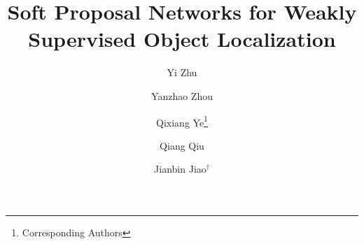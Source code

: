 \documentclass[10pt,twocolumn,letterpaper]{article}
\begin{document}
\makeatletter
\renewcommand*{\@fnsymbol}[1]{\dag}
\makeatother

\title{Soft Proposal Networks for Weakly Supervised Object Localization}

\author[1]{Yi Zhu}
\author[1]{Yanzhao Zhou}
\author[1]{Qixiang Ye\thanks{Corresponding Authors}}
\author[2]{Qiang Qiu}
\author[1]{Jianbin Jiao$^\dag$}


\renewcommand\Authands{ and }


\maketitle














{\small


}
\end{document}
